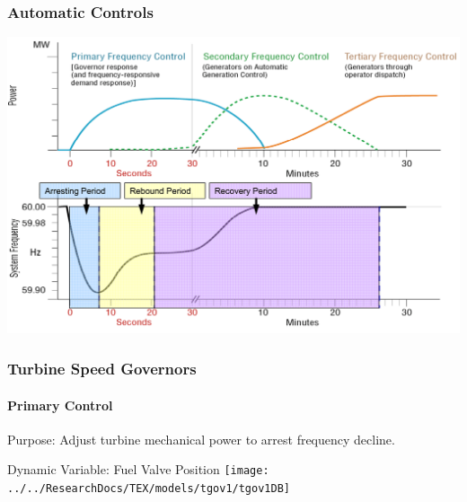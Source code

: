 \documentclass[14pt, unknownkeysallowed]{beamer}
\begin{document}
\begin{frame}
\frametitle{Automatic Controls}
\begin{center}
\includegraphics[height=.82\textheight]{ctrlReactionFlip} {\tiny\cite{ctrlTimeScale}}%
\end{center}
\end{frame}
\begin{frame}
\frametitle{Turbine Speed Governors}
\framesubtitle{Primary Control}

Purpose: Adjust turbine mechanical power to arrest frequency decline.\\
\vspace{.5em}

Dynamic Variable: Fuel Valve Position 
{\centering\texttt{[image: ../../ResearchDocs/TEX/models/tgov1/tgov1DB]}}

\end{frame}
\end{document}
